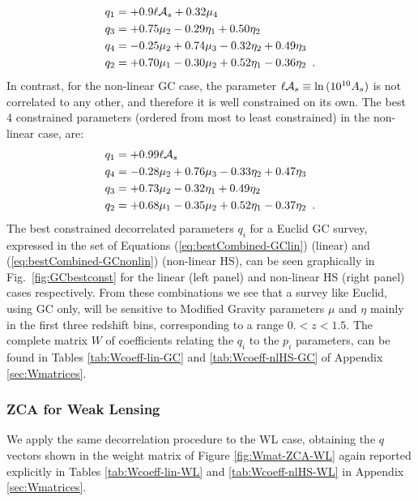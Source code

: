 \begin{equation} \label{eq:bestCombined-GClin}
\begin{aligned}
	q_1  &= +0.9 \ell \mathcal{A}_{s}  +  0.32 \mu_4 \\
	q_3  &= +0.75\mu_2 - 0.29\eta_1 + 0.50 \eta_2\\
	q_4  &= -0.25\mu_2 + 0.74\mu_3  - 0.32 \eta_2 + 0.49 \eta_3 \\
	q_2  &= +0.70\mu_1 - 0.30\mu_2  + 0.52 \eta_1 - 0.36 \eta_2 \,\,\, .
\end{aligned}
\end{equation}
In contrast, for the non-linear GC case, the parameter $\ell \mathcal{A}_{s} \equiv \ln{(10^{10}A_s)}$ is not correlated to any other, and therefore it 
is well constrained on its own. The best 4 constrained parameters (ordered from most to least constrained) in the non-linear case, are:
\begin{equation} \label{eq:bestCombined-GCnonlin}
\begin{aligned}
	q_1  &= +0.99\ell \mathcal{A}_{s} \\
	q_4  &= -0.28\mu_2 + 0.76\mu_3 -0.33 \eta_2 + 0.47 \eta_3\\
	q_3  &= +0.73\mu_2 -0.32 \eta_1 + 0.49 \eta_2\\
	q_2  &= +0.68\mu_1 -0.35\mu_2 + 0.52 \eta_1 -0.37 \eta_2 \,\,\, .
\end{aligned}
\end{equation}
The best constrained decorrelated parameters $q_i$ for a Euclid GC survey, 
expressed in the set of Equations (\ref{eq:bestCombined-GClin}) (linear) and (\ref{eq:bestCombined-GCnonlin}) (non-linear HS), 
can be seen graphically in Fig.\ \ref{fig:GCbestconst} for the linear (left panel) 
and non-linear HS (right panel) cases respectively. 
From these combinations we see that a survey like Euclid, using GC only, will be sensitive to Modified Gravity parameters $\mu$ and $\eta$ mainly in the first three redshift bins, corresponding to a range $0. < z < 1.5$.
The complete matrix $W$ of coefficients relating the $q_i$ to the $p_i$ parameters, 
can be found in Tables \ref{tab:Wcoeff-lin-GC} and \ref{tab:Wcoeff-nlHS-GC} of Appendix \ref{sec:Wmatrices}.


\subsubsection{ZCA for Weak Lensing}

We apply the same decorrelation procedure to the WL case, obtaining the $q$ vectors
shown in the weight matrix of Figure \ref{fig:Wmat-ZCA-WL}
again reported explicitly in Tables \ref{tab:Wcoeff-lin-WL} and \ref{tab:Wcoeff-nlHS-WL}
in Appendix \ref{sec:Wmatrices}. 

